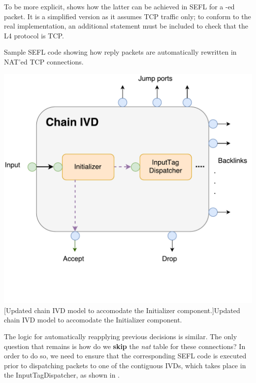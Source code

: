 To be more explicit,  shows how the
latter can be achieved in SEFL for a \SNAT-ed packet.  It is a simplified
version as it assumes TCP traffic only; to conform to the real implementation,
an additional  statement must be included to check that the L4
protocol is TCP.

\begin{minipage}{.6\textwidth}
\begin{listing}[H]
  \caption{Sample SEFL code showing how reply packets are automatically
  rewritten in NAT'ed TCP connections.}
  \label{lst:nat-reply-sefl}
\end{listing}
\end{minipage}\hfill
\begin{minipage}{.36\textwidth}
  \centering
  \includegraphics[scale=0.3]{src/img/chain-internal-initializer}
  [Updated chain IVD model to accomodate the Initializer
  component.]{Updated chain IVD model to accomodate the Initializer component.}
  \label{fig:chain-internal-initializer}
\end{minipage}

\bigskip

The logic for automatically reapplying previous decisions is similar.  The only
question that remains is how do we \textbf{skip} the \emph{nat} table for these
connections?  In order to do so, we need to ensure that the corresponding SEFL
code is executed prior to dispatching packets to one of the contiguous IVDs,
which takes place in the InputTagDispatcher, as shown in
.

